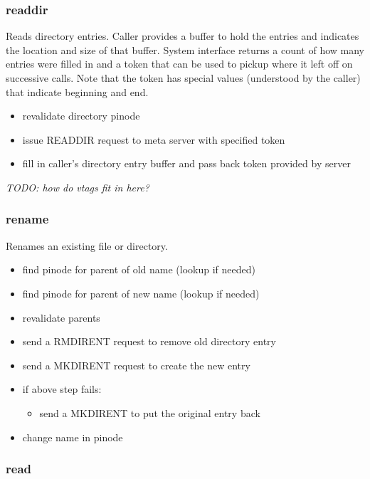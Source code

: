 \documentclass[11pt, letterpaper]{article}
\begin{document}
\subsubsection{readdir}

Reads directory entries.  Caller provides a buffer to hold the entries
and indicates the location and size of that buffer.  System interface
returns a count of how many entries were filled in and a token that can
be used to pickup where it left off on successive calls.  Note that the
token has special values (understood by the caller) that indicate
beginning and end.

\begin{itemize}
\item revalidate directory pinode
\item issue READDIR request to meta server with specified token
\item fill in caller's directory entry buffer and pass back token
provided by server
\end{itemize}

\emph{TODO: how do vtags fit in here?}

\subsubsection{rename}

Renames an existing file or directory.

\begin{itemize}
\item find pinode for parent of old name (lookup if needed)
\item find pinode for parent of new name (lookup if needed)
\item revalidate parents 
\item send a RMDIRENT request to remove old directory entry
\item send a MKDIRENT request to create the new entry
\item if above step fails:
\begin{itemize}
\item send a MKDIRENT to put the original entry back
\end{itemize}
\item change name in pinode
\end{itemize}

\subsubsection{read}
\end{document}
